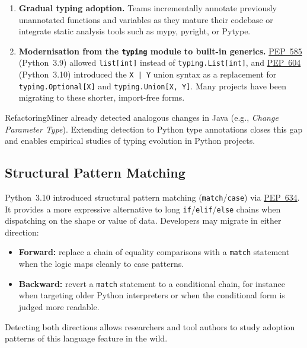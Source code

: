 \documentclass[11pt,a4paper]{article}
\newcommand{\code}[1]{\texttt{#1}}
\begin{document}
\begin{enumerate}[leftmargin=*, label=\arabic*.]
  \item \textbf{Gradual typing adoption.} Teams incrementally annotate previously unannotated functions and variables as they mature their codebase or integrate static analysis tools such as mypy, pyright, or Pytype.

  \item \textbf{Modernisation from the \code{typing} module to built-in generics.}
        \href{https://peps.python.org/pep-0585/}{PEP~585} (Python~3.9) allowed \code{list[int]} instead of \code{typing.List[int]}, and \href{https://peps.python.org/pep-0604/}{PEP~604} (Python~3.10) introduced the \code{X | Y} union syntax as a replacement for \code{typing.Optional[X]} and \code{typing.Union[X, Y]}. Many projects have been migrating to these shorter, import-free forms.
\end{enumerate}

RefactoringMiner already detected analogous changes in Java (e.g., \emph{Change Parameter Type}). Extending detection to Python type annotations closes this gap and enables empirical studies of typing evolution in Python projects.

\subsection{Structural Pattern Matching}

Python~3.10 introduced structural pattern matching (\code{match}/\code{case}) via \href{https://peps.python.org/pep-0634/}{PEP~634}. It provides a more expressive alternative to long \code{if}/\code{elif}/\code{else} chains when dispatching on the shape or value of data. Developers may migrate in either direction:

\begin{itemize}[leftmargin=*]
  \item \textbf{Forward:} replace a chain of equality comparisons with a \code{match} statement when the logic maps cleanly to case patterns.
  \item \textbf{Backward:} revert a \code{match} statement to a conditional chain, for instance when targeting older Python interpreters or when the conditional form is judged more readable.
\end{itemize}

Detecting both directions allows researchers and tool authors to study adoption patterns of this language feature in the wild.
\end{document}
